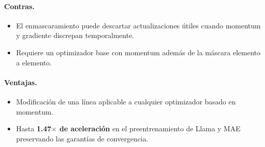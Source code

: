 \paragraph{Contras.}
\begin{itemize}[leftmargin=*]
\item El enmascaramiento puede descartar actualizaciones útiles cuando momentum y gradiente discrepan temporalmente.
\item Requiere un optimizador base con momentum además de la máscara elemento a elemento.
\end{itemize}

\paragraph{Ventajas.}
\begin{itemize}[leftmargin=*]
\item Modificación de una línea aplicable a cualquier optimizador basado en momentum.
\item Hasta \textbf{1.47$\times$ de aceleración} en el preentrenamiento de Llama y MAE preservando las garantías de convergencia.
\end{itemize}

